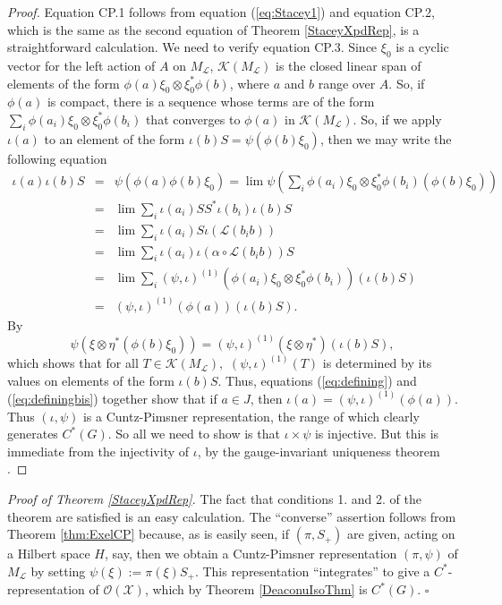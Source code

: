 \documentclass{amsproc}
\theoremstyle{plain}
\theoremstyle{definition}
\theoremstyle{definition}
\theoremstyle{remark}
\theoremstyle{plain}
\begin{document}
\begin{proof}
Equation CP.1 follows from equation (\ref{eq:Stacey1}) and equation
CP.2, which is the same as the second equation of Theorem \ref{StaceyXpdRep},
is a straightforward calculation. We need to verify equation CP.3.
Since $\xi_{0}$ is a cyclic vector for the left action of $A$ on
$M_{\mathcal{L}}$, $\mathcal{K}(M_{\mathcal{L}})$ is the closed
linear span of elements of the form $\phi(a)\xi_{0}\otimes\xi_{0}^{*}\phi(b)$,
where $a$ and $b$ range over $A$. So, if $\phi(a)$ is compact,
there is a sequence whose terms are of the form
$\sum_{i}\phi(a_{i})\xi_{0}\otimes\xi_{0}^{*}\phi(b_{i})$
that converges to $\phi(a)$ in $\mathcal{K}(M_{\mathcal{L}})$. So,
if we apply $\iota(a)$ to an element of the form
$\iota(b)S=\psi(\phi(b)\xi_{0})$,
then we may write the following equation \begin{eqnarray}
\iota(a)\iota(b)S & = &
\psi(\phi(a)\phi(b)\xi_{0})=\lim\psi(\sum_{i}\phi(a_{i})\xi_{0}\otimes\xi_{0}^{*
}\phi(b_{i})(\phi(b)\xi_{0}))\label{eq:defining}\\
 & = & \lim\sum_{i}\iota(a_{i})SS^{*}\iota(b_{i})\iota(b)S\nonumber \\
 & = & \lim\sum_{i}\iota(a_{i})S\iota(\mathcal{L}(b_{i}b))\nonumber \\
 & = & \lim\sum_{i}\iota(a_{i})\iota(\alpha\circ\mathcal{L}(b_{i}b))S\nonumber
\\
 & = &
\lim\sum_{i}(\psi,\iota)^{(1)}(\phi(a_{i})\xi_{0}\otimes\xi_{0}^{*}\phi(b_{i}
))(\iota(b)S)\nonumber \\
 & = & (\psi,\iota)^{(1)}(\phi(a))(\iota(b)S).\nonumber \end{eqnarray}
By \cite[Lemma 4.4.1]{FMR03} \begin{equation}
\psi(\xi\otimes\eta^{*}(\phi(b)\xi_{0}))=(\psi,\iota)^{(1)}(\xi\otimes\eta^{*}
)(\iota(b)S),\label{eq:definingbis}\end{equation}
which shows that for all $T\in\mathcal{K}(M_{\mathcal{L}}),$
$(\psi,\iota)^{(1)}(T)$
is determined by its values on elements of the form $\iota(b)S$.
Thus, equations (\ref{eq:defining}) and (\ref{eq:definingbis}) together
show that if $a\in J$, then $\iota(a)=(\psi,\iota)^{(1)}(\phi(a))$.
Thus $(\iota,\psi)$ is a Cuntz-Pimsner representation, the range
of which clearly generates $C^{*}(G)$. So all we need to show is
that $\iota\times\psi$ is injective. But this is immediate from the
injectivity of $\iota$, by the gauge-invariant uniqueness theorem
\cite[Theorem 4.1]{FMR03}. 
\end{proof}
\emph{Proof of Theorem \ref{StaceyXpdRep}.} The fact that conditions
1. and 2. of the theorem are satisfied is an easy calculation. The
{}``converse'' assertion follows from Theorem \ref{thm:ExelCP}
because, as is easily seen, if $(\pi,S_{+})$ are given, acting on
a Hilbert space $H$, say, then we obtain a Cuntz-Pimsner representation
$(\pi,\psi)$ of $M_{\mathcal{L}}$ by setting $\psi(\xi):=\pi(\xi)S_{+}$.
This representation ``integrates'' to give a $C^{*}$-representation
of $\mathcal{O}(\mathcal{X})$, which by Theorem \ref{DeaconuIsoThm}
is $C^{*}(G)$.  $\square$  
\end{document}
